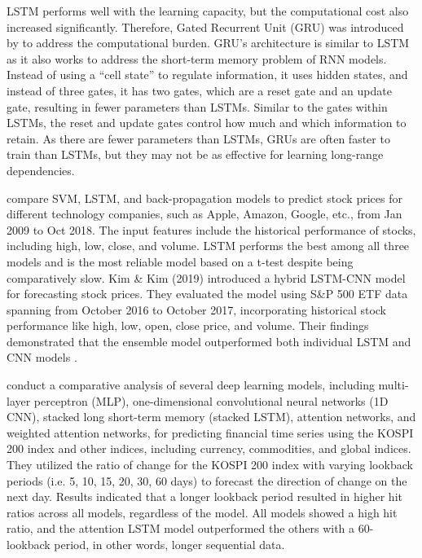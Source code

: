 \documentclass{article}
\begin{document}
LSTM performs well with the learning capacity, but the computational cost also increased significantly. Therefore, Gated Recurrent Unit (GRU) was introduced by \cite{cho2014learning} to address the computational burden. GRU's architecture is similar to LSTM as it also works to address the short-term memory problem of RNN models. Instead of using a “cell state” to regulate information, it uses hidden states, and instead of three gates, it has two gates, which are a reset gate and an update gate, resulting in fewer parameters than LSTMs. Similar to the gates within LSTMs, the reset and update gates control how much and which information to retain. As there are fewer parameters than LSTMs, GRUs are often faster to train than LSTMs, but they may not be as effective for learning long-range dependencies.

\cite{karmiani2019comparison} compare SVM, LSTM, and back-propagation models to predict stock prices for different technology companies, such as Apple, Amazon, Google, etc., from Jan 2009 to Oct 2018. The input features include the historical performance of stocks, including high, low, close, and volume. LSTM performs the best among all three models and is the most reliable model based on a t-test despite being comparatively slow. Kim \& Kim (2019) introduced a hybrid LSTM-CNN model for forecasting stock prices. They evaluated the model using S\&P 500 ETF data spanning from October 2016 to October 2017, incorporating historical stock performance like high, low, open, close price, and volume. Their findings demonstrated that the ensemble model outperformed both individual LSTM and CNN models \citep{kim2019forecasting}.

\cite{kim2019financial} conduct a comparative analysis of several deep learning models, including multi-layer perceptron (MLP), one-dimensional convolutional neural networks (1D CNN), stacked long short-term memory (stacked LSTM), attention networks, and weighted attention networks, for predicting financial time series using the KOSPI 200 index and other indices, including currency, commodities, and global indices. They utilized the ratio of change for the KOSPI 200 index with varying lookback periods (i.e. 5, 10, 15, 20, 30, 60 days) to forecast the direction of change on the next day. Results indicated that a longer lookback period resulted in higher hit ratios across all models, regardless of the model. All models showed a high hit ratio, and the attention LSTM model outperformed the others with a 60-lookback period, in other words, longer sequential data.
\end{document}

